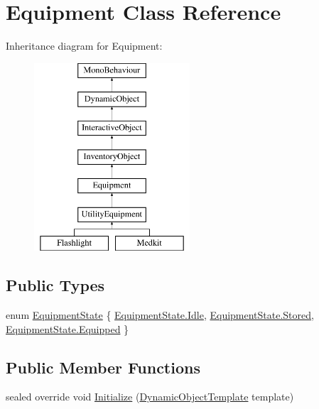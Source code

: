 \hypertarget{class_equipment}{}\section{Equipment Class Reference}
\label{class_equipment}
Inheritance diagram for Equipment\+:\begin{figure}[H]
\begin{center}
\leavevmode
\includegraphics[height=7.000000cm]{class_equipment}
\end{center}
\end{figure}
\subsection*{Public Types}
\begin{DoxyCompactItemize}
\item 
enum \mbox{\hyperlink{class_equipment_a8b3877398e5be5b420818b99ad7f0bca}{Equipment\+State}} \{ \mbox{\hyperlink{class_equipment_a8b3877398e5be5b420818b99ad7f0bcaae599161956d626eda4cb0a5ffb85271c}{Equipment\+State.\+Idle}}, 
\mbox{\hyperlink{class_equipment_a8b3877398e5be5b420818b99ad7f0bcaa7bf2d26eab899c413218b729d4d914b7}{Equipment\+State.\+Stored}}, 
\mbox{\hyperlink{class_equipment_a8b3877398e5be5b420818b99ad7f0bcaa90ebbe94b8f35de8bc27c3a110aac495}{Equipment\+State.\+Equipped}}
 \}
\end{DoxyCompactItemize}
\subsection*{Public Member Functions}
\begin{DoxyCompactItemize}
\item 
sealed override void \mbox{\hyperlink{class_equipment_a4ba8229a93cd0f2872f7249fbbb56c23}{Initialize}} (\mbox{\hyperlink{class_dynamic_object_template}{Dynamic\+Object\+Template}} template)
\end{DoxyCompactItemize}
